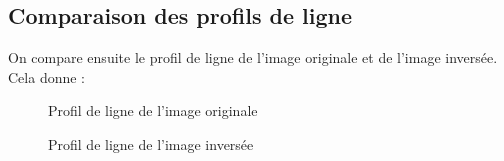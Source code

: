 \documentclass[french,a4paper,10pt]{article}
\begin{document}
    \subsection{Comparaison des profils de ligne}\label{subsec:2.1}

    On compare ensuite le profil de ligne de l'image originale et de l'image inversée.
    Cela donne :
    \begin{figure}[!htb]
        \begin{minipage}{0.48\textwidth}
            \centering
            \caption{Profil de ligne de l'image originale}\label{Fig:prof-peppers-grey-1}
        \end{minipage}\hfill
        \begin{minipage}{0.48\textwidth}
            \centering
            \caption{Profil de ligne de l'image inversée}\label{Fig:prof-peppers-grey-inverse}
        \end{minipage}
    \end{figure}
\end{document}
